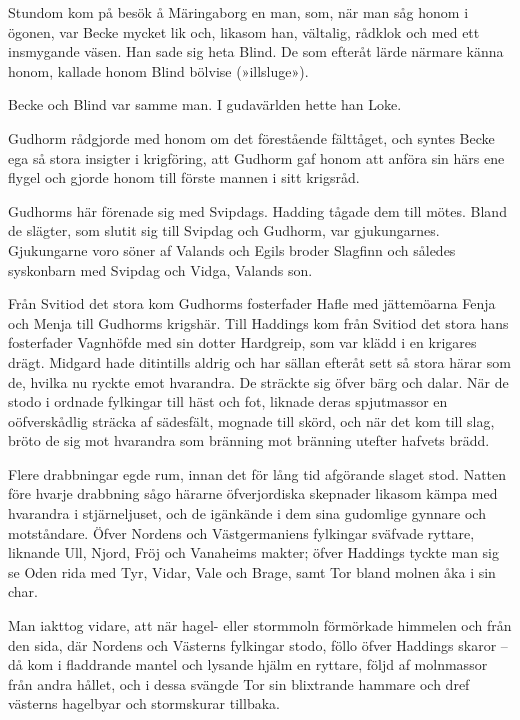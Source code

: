 Stundom kom på besök å Märingaborg en man, som, när man såg honom i
ögonen, var Becke mycket lik och, likasom han, vältalig, rådklok och med
ett insmygande väsen. Han sade sig heta Blind. De som efteråt lärde
närmare känna honom, kallade honom Blind bölvise (»illsluge»).

Becke och Blind var samme man. I gudavärlden hette han Loke.

Gudhorm rådgjorde med honom om det förestående fälttåget, och syntes
Becke ega så stora insigter i krigföring, att Gudhorm gaf honom att
anföra sin härs ene flygel och gjorde honom till förste mannen i sitt
krigsråd.

Gudhorms här förenade sig med Svipdags. Hadding tågade dem till mötes.
Bland de slägter, som slutit sig till Svipdag och Gudhorm, var
gjukungarnes. Gjukungarne voro söner af Valands och Egils broder
Slagfinn och således syskonbarn med Svipdag och Vidga, Valands son.

Från Svitiod det stora kom Gudhorms fosterfader Hafle med jättemöarna
Fenja och Menja till Gudhorms krigshär. Till Haddings kom från Svitiod
det stora hans fosterfader Vagnhöfde med sin dotter Hardgreip, som var
klädd i en
\protect\hypertarget{lb1625905.xhtmlux5cux23start159}{}{}\protect\hypertarget{lb1625905.xhtmlux5cux23start159-a}{}{}\protect\hypertarget{lb1625905.xhtmlux5cux23start159-b}{}{}\protect\hypertarget{lb1625905.xhtmlux5cux23start159-c}{}{}\protect\hypertarget{lb1625905.xhtmlux5cux23start159-d}{}{}
krigares drägt. Midgard hade ditintills aldrig och har sällan efteråt
sett så stora härar som de, hvilka nu ryckte emot hvarandra. De sträckte
sig öfver bärg och dalar. När de stodo i ordnade fylkingar till häst och
fot, liknade deras spjutmassor en oöfverskådlig sträcka af sädesfält,
mognade till skörd, och när det kom till slag, bröto de sig mot
hvarandra som bränning mot bränning utefter hafvets brädd.

Flere drabbningar egde rum, innan det för lång tid afgörande slaget
stod. Natten före hvarje drabbning sågo härarne öfverjordiska skepnader
likasom kämpa med hvarandra i stjärneljuset, och de igänkände i dem sina
gudomlige gynnare och motståndare. Öfver Nordens och Västgermaniens
fylkingar sväfvade ryttare, liknande Ull, Njord, Fröj och Vanaheims
makter; öfver Haddings tyckte man sig se Oden rida med Tyr, Vidar, Vale
och Brage, samt Tor bland molnen åka i sin char.

Man iakttog vidare, att när hagel- eller stormmoln förmörkade himmelen
och från den sida, där Nordens och Västerns fylkingar stodo, föllo öfver
Haddings skaror -- då kom i fladdrande mantel och lysande hjälm en
ryttare, följd af molnmassor från andra hållet, och i dessa svängde Tor
sin blixtrande hammare och dref västerns hagelbyar och stormskurar
tillbaka.

